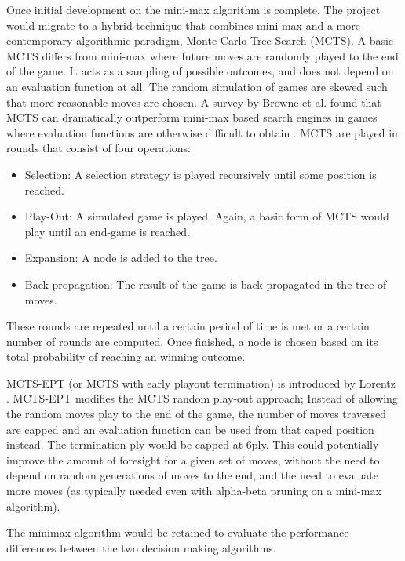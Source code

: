 \documentclass[12pt,a4paper]{article}
\begin{document}
        Once initial development on the mini-max algorithm is complete, The project would migrate to a hybrid technique that combines mini-max and a more contemporary algorithmic paradigm, Monte-Carlo Tree Search (MCTS). A basic MCTS differs from mini-max where future moves are randomly played to the end of the game. It acts as a sampling of possible outcomes, and does not depend on an evaluation function at all. The random simulation of games are skewed such that more reasonable moves are chosen. A survey by Browne et al. found that MCTS can dramatically outperform mini-max based search engines in games where evaluation functions are otherwise difficult to obtain \cite{browne_survey_2012}. MCTS are played in rounds that consist of four operations:

        \begin{itemize}
            \item Selection: A selection strategy is played recursively until some position is reached. 
            \item Play-Out: A simulated game is played. Again, a basic form of MCTS would play until an end-game is reached.
            \item Expansion: A node is added to the tree.
            \item Back-propagation: The result of the game is back-propagated in the tree of moves.
        \end{itemize}

        These rounds are repeated until a certain period of time is met or a certain number of rounds are computed. Once finished, a node is chosen based on its total probability of reaching an winning outcome.

        MCTS-EPT (or MCTS with early playout termination) is introduced by Lorentz \cite{lorentz_using_2016}. MCTS-EPT modifies the MCTS random play-out approach; Instead of allowing the random moves play to the end of the game, the number of moves traversed are capped and an evaluation function can be used from that caped position instead. The termination ply would be capped at 6ply. This could potentially improve the amount of foresight for a given set of moves, without the need to depend on random generations of moves to the end, and the need to evaluate more moves (as typically needed even with alpha-beta pruning on a mini-max algorithm).

   

        The minimax algorithm would be retained to evaluate the performance differences between the  two decision making algorithms.
        
\end{document}
